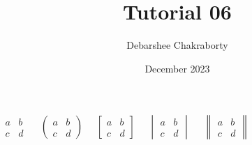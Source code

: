 \documentclass{article}
\title{Tutorial 06}
\author{Debarshee Chakraborty}
\date{December 2023}
\begin{document}
\maketitle
$
\begin{matrix}
    a & b \\
    c & d
\end{matrix}
\quad
$
$
\begin{pmatrix}
    a & b \\
    c & d
\end{pmatrix}
\quad
$
$
\begin{bmatrix}
    a & b \\
    c & d
\end{bmatrix}
\quad
$
$
\begin{vmatrix}
    a & b \\
    c & d
\end{vmatrix}
\quad
$
$
\begin{Vmatrix}
    a & b \\
    c & d
\end{Vmatrix}
\quad
$
\end{document}
